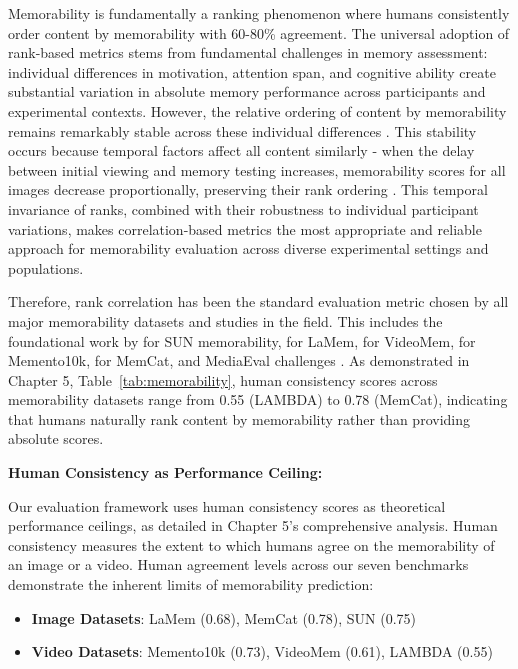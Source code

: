 Memorability is fundamentally a ranking phenomenon where humans consistently order content by memorability with 60-80\% agreement. The universal adoption of rank-based metrics stems from fundamental challenges in memory assessment: individual differences in motivation, attention span, and cognitive ability create substantial variation in absolute memory performance across participants and experimental contexts. However, the relative ordering of content by memorability remains remarkably stable across these individual differences \cite{isola2011makes,khosla2015understanding}. This stability occurs because temporal factors affect all content similarly - when the delay between initial viewing and memory testing increases, memorability scores for all images decrease proportionally, preserving their rank ordering \cite{isola2011makes}. This temporal invariance of ranks, combined with their robustness to individual participant variations, makes correlation-based metrics the most appropriate and reliable approach for memorability evaluation across diverse experimental settings and populations.

Therefore, rank correlation has been the standard evaluation metric chosen by all major memorability datasets and studies in the field. This includes the foundational work by \citet{isola2011makes} for SUN memorability, \citet{khosla2015understanding} for LaMem, \citet{cohendet2019videomem} for VideoMem, \citet{newman2020multimodal} for Memento10k, \citet{goetschalckx2019memcat} for MemCat, and MediaEval challenges \cite{Kiziltepe2021}. As demonstrated in Chapter 5, Table~\ref{tab:memorability}, human consistency scores across memorability datasets range from 0.55 (LAMBDA) to 0.78 (MemCat), indicating that humans naturally rank content by memorability rather than providing absolute scores.
    

\textbf{Human Consistency as Performance Ceiling:}

Our evaluation framework uses human consistency scores as theoretical performance ceilings, as detailed in Chapter 5's comprehensive analysis. Human consistency measures the extent to which humans agree on the memorability of an image or a video. Human agreement levels across our seven benchmarks demonstrate the inherent limits of memorability prediction:

\begin{itemize}
    \item \textbf{Image Datasets}: LaMem (0.68), MemCat (0.78), SUN (0.75)
    \item \textbf{Video Datasets}: Memento10k (0.73), VideoMem (0.61), LAMBDA (0.55)
\end{itemize}


